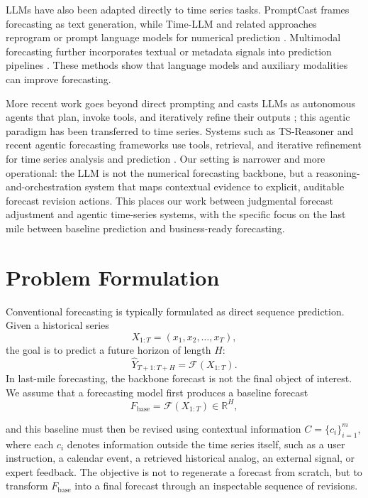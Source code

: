 \documentclass{article}
\theoremstyle{plain}
\theoremstyle{definition}
\theoremstyle{remark}
\begin{document}
LLMs have also been adapted directly to time series tasks. PromptCast frames forecasting as text generation, while Time-LLM and related approaches reprogram or prompt language models for numerical prediction \cite{jin2023time,xue2023promptcast}. Multimodal forecasting further incorporates textual or metadata signals into prediction pipelines \cite{kim2024multi,jiang2025multi}. These methods show that language models and auxiliary modalities can improve forecasting.

More recent work goes beyond direct prompting and casts LLMs as autonomous agents that plan, invoke tools, and iteratively refine their outputs \cite{yao2023react,shinn2023reflexion}; this agentic paradigm has been transferred to time series. Systems such as TS-Reasoner and recent agentic forecasting frameworks use tools, retrieval, and iterative refinement for time series analysis and prediction \cite{citation-0,yeh2025empowering,jalori-etal-2025-flairr,zhao2025timeseriesscientist}. Our setting is narrower and more operational: the LLM is not the numerical forecasting backbone, but a reasoning-and-orchestration system that maps contextual evidence to explicit, auditable forecast revision actions. This places our work between judgmental forecast adjustment and agentic time-series systems, with the specific focus on the last mile between baseline prediction and business-ready forecasting.

\section{Problem Formulation}
\label{sec:problem}

Conventional forecasting is typically formulated as direct sequence prediction. Given a historical series
\begin{equation}
    X_{1:T} = (x_1, x_2, \dots, x_T),
\end{equation}
the goal is to predict a future horizon of length \(H\):
\begin{equation}
    \hat{Y}_{T+1:T+H} = \mathcal{F}(X_{1:T}).
\end{equation}
In last-mile forecasting, the backbone forecast is not the final object of interest. We assume that a forecasting model first produces a baseline forecast
\begin{equation}
    F_{\text{base}} = \mathcal{F}(X_{1:T}) \in \mathbb{R}^{H},
\end{equation}

and this baseline must then be revised using contextual information $C = \{c_i\}_{i=1}^{m}$, where each \(c_i\) denotes information outside the time series itself, such as a user instruction, a calendar event, a retrieved historical analog, an external signal, or expert feedback. The objective is not to regenerate a forecast from scratch, but to transform \(F_{\text{base}}\) into a final forecast through an inspectable sequence of revisions.
\end{document}
